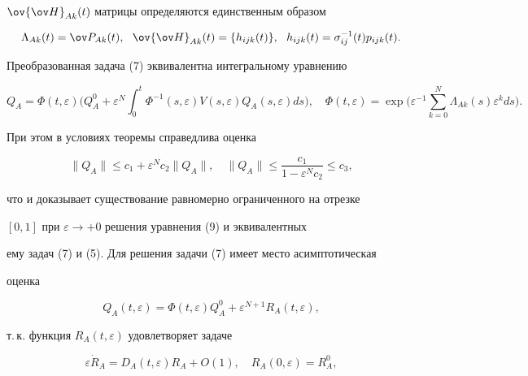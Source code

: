 \begin{pf}
$\ov{\ov H}_{Ak}(t)$ матрицы определяются единственным образом 


$$ 


\Lambda_{Ak}(t)=\ov P_{Ak}(t),\ \ \ov{\ov H}_{Ak}(t)= 


\{h_{ijk}(t)\},\ \ h_{ijk}(t)=\sigma^{-1}_{ij}(t) 


p_{ijk}(t). 


$$ 


 


Преобразованная задача (7) эквивалентна интегральному уравнению 


\begin{equation} 


Q_A=\Phi(t,\varepsilon)\bigg(Q^0_A+\varepsilon^N\int^t_0 


\Phi^{-1}(s,\varepsilon)V(s,\varepsilon)Q_A(s,\varepsilon)ds\bigg), 


\quad \Phi(t,\varepsilon) =


\exp\bigg(\varepsilon^{-1}


\sum^N_{k=0}\Lambda_{Ak}(s)\varepsilon^k ds\bigg). 


\end{equation} 


При этом в условиях теоремы справедлива оценка 


$$ 


\|Q_A\|\le c_1+\varepsilon^N c_2\|Q_A\|,\quad 


\|Q_A\|\le\frac{c_1}{1-\varepsilon^N c_2}\le c_3, 


$$ 


что и доказывает существование равномерно ограниченного на отрезке 


$[0,1]$ при $\varepsilon\to+0$ решения уравнения (9) и эквивалентных 


ему задач (7) и (5). Для решения задачи (7) имеет место асимптотическая 


оценка 


$$ 


Q_A(t,\varepsilon)=\Phi(t,\varepsilon)Q^0_A+ 


\varepsilon^{N+1}R_A(t,\varepsilon), 


$$ 


т.\,к. функция $R_A(t,\varepsilon)$ удовлетворяет задаче 


$$ 


\varepsilon\Dot R_A=D_A(t,\varepsilon)R_A+O(1),\quad 


R_A(0,\varepsilon)=R^0_A, 


$$ 



\end{pf}
